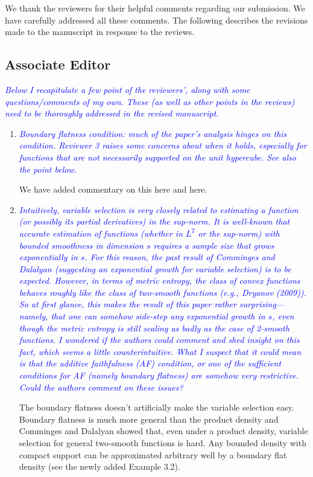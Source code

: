 \documentclass[pdftex,12pt]{article}
\def\rc#1{{\it\textcolor{blue}{#1}}\smallskip}
\begin{document}
\vspace*{5pt}

We thank the reviewers for their helpful comments regarding our
submission. We have carefully addressed all these comments. The
following describes the revisions made to the manuscript in response
to the reviews.

\subsection*{Associate Editor}

\rc{Below I recapitulate a few
point of the reviewers', along with some questions/comments of my own.
These (as well as other points in the reviews) need to be thoroughly
addressed in the revised manuscript.}

\begin{enumerate}
\item \rc{Boundary flatness condition: much of the paper's analysis hinges on
this condition.  Reviewer 3 raises some concerns about when it holds,
especially for functions that are not necessarily supported on the
unit hypercube.  See also the point below.}

We have added commentary on this here and here.

\item \rc{Intuitively, variable selection is very closely related to
estimating a function (or possibly its partial derivatives) in the
sup-norm.  It is well-known that accurate estimation of functions
(whether in $L^2$ or the sup-norm) with bounded smoothness in dimension
$s$ requires a sample size that grows exponentially in $s$.  For this
reason, the past result of Comminges and Dalalyan (suggesting an
exponential growth for variable selection) is to be expected.
However, in terms of metric entropy, the class of convex functions
behaves roughly like the class of two-smooth functions (e.g., Dryanov
(2009)).  So at first glance, this makes the result of this paper
rather surprising---namely, that one can somehow side-step any
exponential growth in $s$, even though the metric entropy is still
scaling as badly as the case of 2-smooth functions.  I wondered if the
authors could comment and shed insight on this fact, which seems a
little counterintuitive.  What I suspect that it could mean is that
the additive faithfulness (AF) condition, or one of the sufficient
conditions for AF (namely boundary flatness) are somehow very
restrictive.  Could the authors comment on these issues?}

The boundary flatness doesn't artificially make the variable selection easy. Boundary flatness is much more general than the product density and Comminges and Dalalyan showed that, even under a product density, variable selection for general two-smooth functions is hard. Any bounded density with compact support can be approximated arbitrary well by a boundary flat density (see the newly added Example 3.2).


\end{enumerate}
\end{document}
